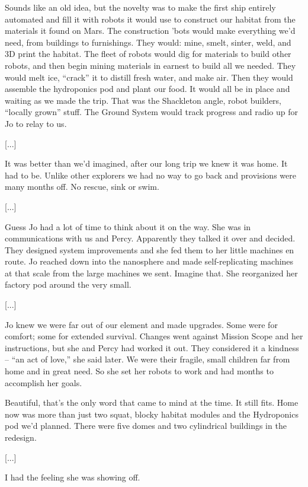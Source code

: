 \documentclass[11pt,a4paper]{article}
\newcommand{\storybreak}{%
  \par\vspace{0.6\baselineskip}
  \begin{center}\color{storyblue}\small *\enspace *\enspace *\end{center}
  \vspace{0.3\baselineskip}\noindent\ignorespaces
}
\begin{document}
Sounds like an old idea, but the novelty was to make the first ship entirely automated and fill it with robots it would use to construct our habitat from the materials it found on Mars. The construction ’bots would make everything we’d need, from buildings to furnishings. They would: mine, smelt, sinter, weld, and 3D print the habitat. The fleet of robots would dig for materials to build other robots, and then begin mining materials in earnest to build all we needed. They would melt ice, “crack” it to distill fresh water, and make air. Then they would assemble the hydroponics pod and plant our food. It would all be in place and waiting as we made the trip. That was the Shackleton angle, robot builders, “locally grown” stuff. The Ground System would track progress and radio up for Jo to relay to us.

[...]

\storybreak

It was better than we’d imagined, after our long trip we knew it was home. It had to be. Unlike other explorers we had no way to go back and provisions were many months off. No rescue, sink or swim.

[...]

Guess Jo had a lot of time to think about it on the way. She was in communications with us and Percy. Apparently they talked it over and decided. They designed system improvements and she fed them to her little machines en route. Jo reached down into the nanosphere and made self-replicating machines at that scale from the large machines we sent. Imagine that. She reorganized her factory pod around the very small.

[...]

Jo knew we were far out of our element and made upgrades. Some were for comfort; some for extended survival. Changes went against Mission Scope and her instructions, but she and Percy had worked it out. They considered it a kindness – “an act of love,” she said later. We were their fragile, small children far from home and in great need. So she set her robots to work and had months to accomplish her goals.

Beautiful, that’s the only word that came to mind at the time. It still fits. Home now was more than just two squat, blocky habitat modules and the Hydroponics pod we’d planned. There were five domes and two cylindrical buildings in the redesign.

[...]

I had the feeling she was showing off.
\end{document}

